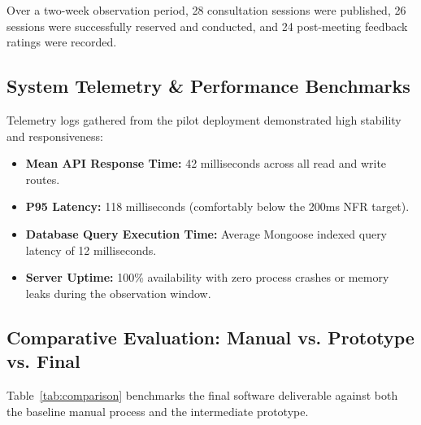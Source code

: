 \documentclass[11pt,a4paper]{article}
\begin{document}
Over a two-week observation period, 28 consultation sessions were published, 26 sessions were successfully reserved and conducted, and 24 post-meeting feedback ratings were recorded.

\subsection{System Telemetry \& Performance Benchmarks}
Telemetry logs gathered from the pilot deployment demonstrated high stability and responsiveness:
\begin{itemize}[leftmargin=1.4em, itemsep=0.2em]
  \item \textbf{Mean API Response Time:} 42 milliseconds across all read and write routes.
  \item \textbf{P95 Latency:} 118 milliseconds (comfortably below the 200ms NFR target).
  \item \textbf{Database Query Execution Time:} Average Mongoose indexed query latency of 12 milliseconds.
  \item \textbf{Server Uptime:} 100\% availability with zero process crashes or memory leaks during the observation window.
\end{itemize}

\subsection{Comparative Evaluation: Manual vs. Prototype vs. Final}
Table~\ref{tab:comparison} benchmarks the final software deliverable against both the baseline manual process and the intermediate prototype.
\end{document}
